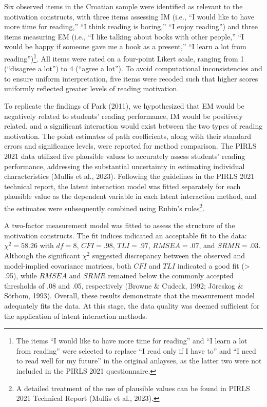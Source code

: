 \documentclass[
  man,mask]{apa6}
\begin{document}
Six observed items in the Croatian sample were identified as relevant to the motivation constructs, with three items assessing IM (i.e., ``I would like to have more time for reading,'' ``I think reading is boring,'' ``I enjoy reading'') and three items measuring EM (i.e., ``I like talking about books with other people,'' ``I would be happy if someone gave me a book as a present,'' ``I learn a lot from reading'')\footnote{The items ``I would like to have more time for reading'' and ``I learn a lot from reading'' were selected to replace ``I read only if I have to'' and ``I need to read well for my future'' in the original anlayses, as the latter two were not included in the PIRLS 2021 questionnaire.}. All items were rated on a four-point Likert scale, ranging from 1 (``disagree a lot'') to 4 (``agree a lot''). To avoid computational inconsistencies and to ensure uniform interpretation, five items were recoded such that higher scores uniformly reflected greater levels of reading motivation.

To replicate the findings of Park (2011), we hypothesized that EM would be negatively related to students' reading performance, IM would be positively related, and a significant interaction would exist between the two types of reading motivation. The point estimates of path coefficients, along with their standard errors and significance levels, were reported for method comparison. The PIRLS 2021 data utilized five plausible values to accurately assess students' reading performance, addressing the substantial uncertainty in estimating individual characteristics (Mullis et al., 2023). Following the guidelines in the PIRLS 2021 technical report, the latent interaction model was fitted separately for each plausible value as the dependent variable in each latent interaction method, and the estimates were subsequently combined using Rubin's rules\footnote{A detailed treatment of the use of plausible values can be found in PIRLS 2021 Technical Report (Mullis et al., 2023).}.

A two-factor measurement model was fitted to assess the structure of the motivation constructs. The fit indices indicated an acceptable fit to the data: \(\chi^2 = 58.26\) with \(\textit{df} = 8\), \(CFI = .98\), \(TLI = .97\), \(RMSEA = .07\), and \(SRMR = .03\). Although the significant \(\chi^2\) suggested discrepancy between the observed and model-implied covariance matrices, both \(CFI\) and \(TLI\) indicated a good fit (\textgreater{} .95), while \(RMSEA\) and \(SRMR\) remained below the commonly accepted thresholds of .08 and .05, respectively (Browne \& Cudeck, 1992; Jöreskog \& Sörbom, 1993). Overall, these results demonstrate that the measurement model adequately fits the data. At this stage, the data quality was deemed sufficient for the application of latent interaction methods.
\end{document}

